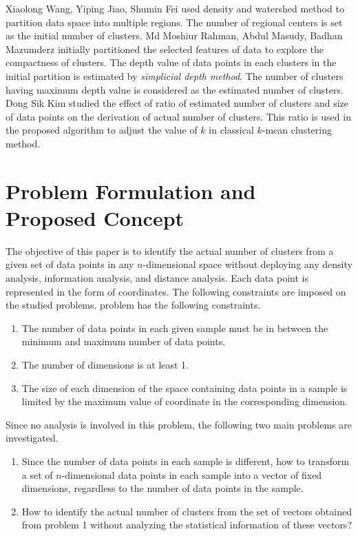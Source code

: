 \documentclass[lettersize,journal]{IEEEtran}
\begin{document}
Xiaolong Wang, Yiping Jiao, Shumin Fei \cite{Xiaolong} used density and watershed method to partition
data space into multiple regions. The number of regional centers is set as the initial number of clusters. 
Md Moshiur Rahman, Abdul Masudy, Badhan Mazumderz \cite{Rahman} initially partitioned the selected 
features of data to explore the compactness of clusters. The depth value of data points in each clusters 
in the initial partition is estimated by {\em simplicial depth method}. The number of clusters having maximum depth value is considered as the estimated number of clusters. 
Dong Sik Kim \cite{Dong} studied the effect of ratio of estimated number of clusters and size of data 
points on the derivation of actual number of clusters.
This ratio is used in the proposed algorithm to adjust the value of $k$ in classical
$k$-mean clustering method.
 
\section{Problem Formulation and Proposed Concept}
The objective of this paper is to identify the actual number of clusters from a given set of data
points in any $n$-dimensional space without deploying any density analysis, information analysis,
and distance analysis. Each data point is represented in the form of coordinates. The following 
constraints are imposed on the studied problems.
 problem
has the following constraints.
\begin{enumerate}
\item The number of data points in each given sample must be in between the minimum and maximum 
number of data points.
\item The number of dimensions is at least 1.
\item The size of each dimension of the space containing data points in a sample is limited by 
the maximum value of coordinate in the corresponding dimension.
\end{enumerate}
Since no analysis is involved in this problem, the following two main problems are investigated.
\begin{enumerate}
\item Since the number of data points in each sample is different, how to transform a set of 
$n$-dimensional data points in each sample into a vector of fixed 
dimensions, regardless to the number of data points in the sample.
\item How to identify the actual number of clusters from the set of vectors obtained from problem 1
without analyzing the statistical information of these vectors? 
\end{enumerate}
 
\end{document}
